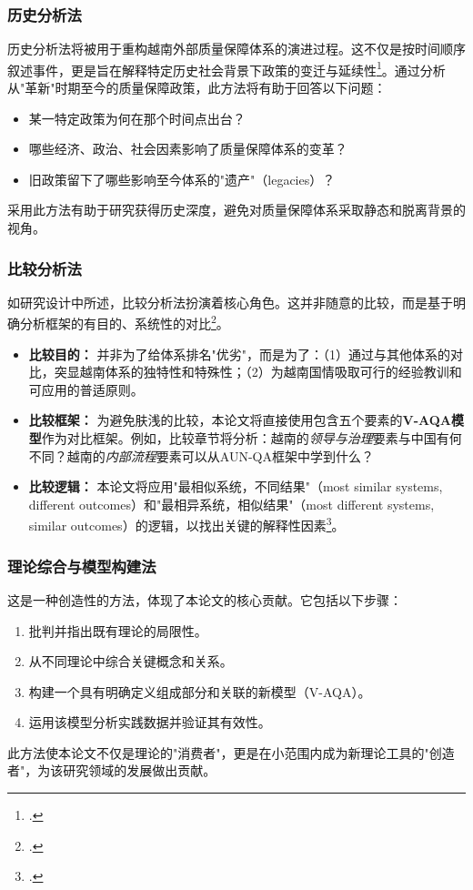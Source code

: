 \subsubsection{历史分析法}
\label{subsubsec:phan_tich_lich_su}
历史分析法将被用于重构越南外部质量保障体系的演进过程。这不仅是按时间顺序叙述事件，更是旨在解释特定历史社会背景下政策的变迁与延续性\footcite{Tosh2015}。通过分析从"革新"时期至今的质量保障政策，此方法将有助于回答以下问题：
\begin{itemize}
    \item 某一特定政策为何在那个时间点出台？
    \item 哪些经济、政治、社会因素影响了质量保障体系的变革？
    \item 旧政策留下了哪些影响至今体系的"遗产"（legacies）？
\end{itemize}
采用此方法有助于研究获得历史深度，避免对质量保障体系采取静态和脱离背景的视角。

\subsubsection{比较分析法}
\label{subsubsec:phan_tich_so_sanh}
如研究设计中所述，比较分析法扮演着核心角色。这并非随意的比较，而是基于明确分析框架的有目的、系统性的对比\footcite{Sartori1991}。
\begin{itemize}
    \item \textbf{比较目的：} 并非为了给体系排名"优劣"，而是为了：（1）通过与其他体系的对比，突显越南体系的独特性和特殊性；（2）为越南国情吸取可行的经验教训和可应用的普适原则。
    \item \textbf{比较框架：} 为避免肤浅的比较，本论文将直接使用包含五个要素的\textbf{V-AQA模型}作为对比框架。例如，比较章节将分析：越南的\textit{领导与治理}要素与中国有何不同？越南的\textit{内部流程}要素可以从AUN-QA框架中学到什么？
    \item \textbf{比较逻辑：} 本论文将应用"最相似系统，不同结果"（most similar systems, different outcomes）和"最相异系统，相似结果"（most different systems, similar outcomes）的逻辑，以找出关键的解释性因素\footcite{PrzeworskiTeune1970}。
\end{itemize}

\subsubsection{理论综合与模型构建法}
\label{subsubsec:xay_dung_mo_hinh}
这是一种创造性的方法，体现了本论文的核心贡献。它包括以下步骤：
\begin{enumerate}
    \item 批判并指出既有理论的局限性。
    \item 从不同理论中综合关键概念和关系。
    \item 构建一个具有明确定义组成部分和关联的新模型（V-AQA）。
    \item 运用该模型分析实践数据并验证其有效性。
\end{enumerate}
此方法使本论文不仅是理论的"消费者"，更是在小范围内成为新理论工具的"创造者"，为该研究领域的发展做出贡献。

